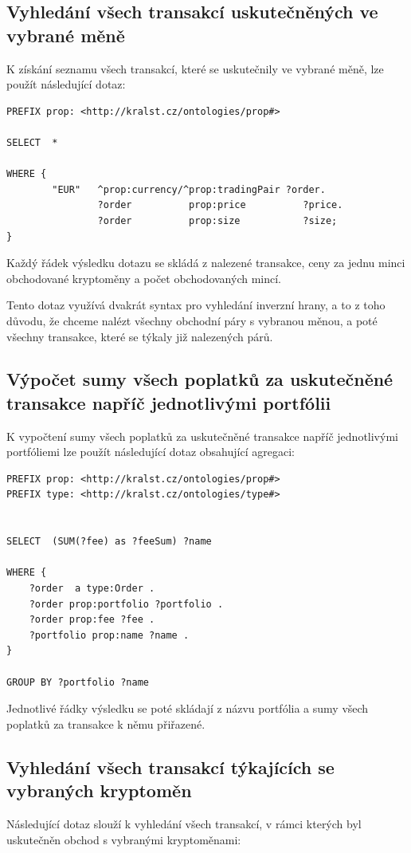 \documentclass[12pt, a4paper]{article}
\begin{document}
\subsection{Vyhledání všech transakcí uskutečněných ve vybrané měně}
K získání seznamu všech transakcí, které se uskutečnily ve vybrané měně, lze použít následující dotaz:

\begin{lstlisting}
PREFIX prop: <http://kralst.cz/ontologies/prop#>

SELECT  *

WHERE {
	    "EUR"	^prop:currency/^prop:tradingPair ?order.
                ?order			prop:price			?price.
                ?order			prop:size			?size;
}
\end{lstlisting}
Každý řádek výsledku dotazu se skládá z nalezené transakce, ceny za jednu minci obchodované kryptoměny a počet obchodovaných mincí.

Tento dotaz využívá dvakrát syntax pro vyhledání inverzní hrany, a to z toho důvodu, že chceme nalézt všechny obchodní páry s vybranou měnou, a poté všechny transakce, které se týkaly již nalezených párů.


\subsection{Výpočet sumy všech poplatků za uskutečněné transakce napříč jednotlivými portfólii}
K vypočtení sumy všech poplatků za uskutečněné transakce napříč jednotlivými portfóliemi lze použít následující dotaz obsahující agregaci:

\begin{lstlisting}
PREFIX prop: <http://kralst.cz/ontologies/prop#>
PREFIX type: <http://kralst.cz/ontologies/type#>


SELECT  (SUM(?fee) as ?feeSum) ?name

WHERE {
    ?order	a type:Order .
    ?order prop:portfolio ?portfolio .
    ?order prop:fee ?fee .
    ?portfolio prop:name ?name .
}

GROUP BY ?portfolio	?name

\end{lstlisting}

Jednotlivé řádky výsledku se poté skládají z názvu portfólia a sumy všech poplatků za transakce k němu přiřazené.


\subsection{Vyhledání všech transakcí týkajících se vybraných kryptoměn}
Následující dotaz slouží k vyhledání všech transakcí, v rámci kterých byl uskutečněn obchod s vybranými kryptoměnami:
\end{document}
